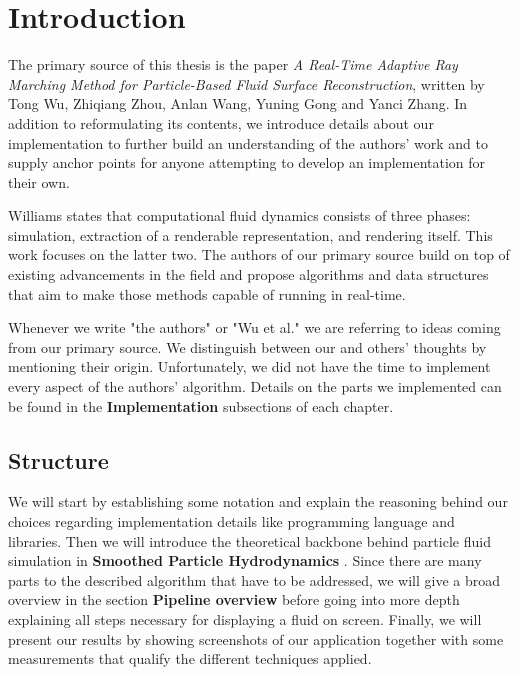 %
\chapter{Introduction}
\label{sec:intro}

The primary source of this thesis is the paper \textit{A Real-Time Adaptive Ray Marching Method for Particle-Based Fluid Surface Reconstruction}, written by Tong Wu, Zhiqiang Zhou, Anlan Wang, Yuning Gong and Yanci Zhang. In addition to reformulating its contents, we introduce details about our implementation to further build an understanding of the authors' work and to supply anchor points for anyone attempting to develop an implementation for their own.

Williams \cite{Williams:2008} states that computational fluid dynamics consists of three phases: simulation, extraction of a renderable representation, and rendering itself. This work focuses on the latter two. The authors of our primary source build on top of existing advancements in the field and propose algorithms and data structures that aim to make those methods capable of running in real-time.

Whenever we write "the authors" or "Wu et al." we are referring to ideas coming from our primary source. We distinguish between our and others' thoughts by mentioning their origin. Unfortunately, we did not have the time to implement every aspect of the authors' algorithm. Details on the parts we implemented can be found in the \textbf{Implementation} subsections of each chapter.

\section{Structure}

We will start by establishing some notation and explain the reasoning behind our choices regarding implementation details like programming language and libraries. Then we will introduce the theoretical backbone behind particle fluid simulation in \textbf{Smoothed Particle Hydrodynamics }. Since there are many parts to the described algorithm that have to be addressed, we will give a broad overview in the section \textbf{Pipeline overview } before going into more depth explaining all steps necessary for displaying a fluid on screen. Finally, we will present our results by showing screenshots of our application together with some measurements that qualify the different techniques applied.

